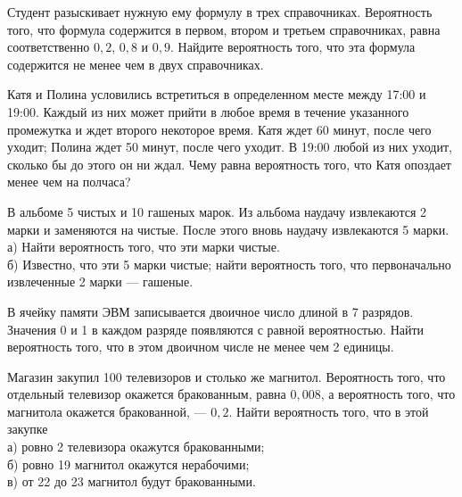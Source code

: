 \newpage\setcounter{zad}{0}



\begin{zkrW}{20}\noindent 
	Студент разыскивает нужную ему формулу в трех справочниках. Вероятность того, что формула содержится в первом, втором и третьем справочниках, равна соответственно $0{,}2$, $0{,}8$ и $0{,}9$. Найдите вероятность того, что эта формула содержится не менее чем в двух справочниках.
 
\end{zkrW}

\begin{zkrW}{20}\noindent 
	Катя и Полина условились встретиться в определенном месте между 17:00 и 19:00. Каждый из них может прийти в любое время в течение указанного промежутка и ждет второго некоторое время. Катя ждет 60 минут, после чего уходит; Полина ждет 50 минут, после чего уходит. В 19:00 любой из них уходит, сколько бы до этого он ни ждал. Чему равна вероятность того, что Катя опоздает менее чем на полчаса?
 
\end{zkrW}

\begin{zkrW}{20}\noindent 
	В альбоме 5 чистых и 10 гашеных марок. Из альбома наудачу извлекаются 2 марки и заменяются на чистые. После этого вновь наудачу извлекаются 5 марки. \\ \indent а) Найти вероятность того, что эти марки чистые. \\ \indent б) Известно, что эти 5 марки чистые; найти вероятность того, что первоначально извлеченные 2 марки --- гашеные.
 
\end{zkrW}

\begin{zkrW}{20}\noindent 
	В ячейку памяти ЭВМ записывается двоичное число длиной в 7 разрядов. Значения 0 и 1 в каждом разряде появляются с равной вероятностью. Найти вероятность того, что в этом двоичном числе не менее чем 2 единицы.
 
\end{zkrW}

\begin{zkrW}{20}\noindent 
	Магазин закупил 100 телевизоров и столько же магнитол. Вероятность того, что отдельный телевизор окажется бракованным, равна $0{,}008$, а вероятность того, что магнитола окажется бракованной, --- $0{,}2$. Найти вероятность того, что в этой закупке \\ \indent а) ровно 2 телевизора окажутся бракованными; \\ \indent б) ровно 19 магнитол окажутся нерабочими; \\ \indent в) от 22 до 23 магнитол будут бракованными.
 
\end{zkrW}

